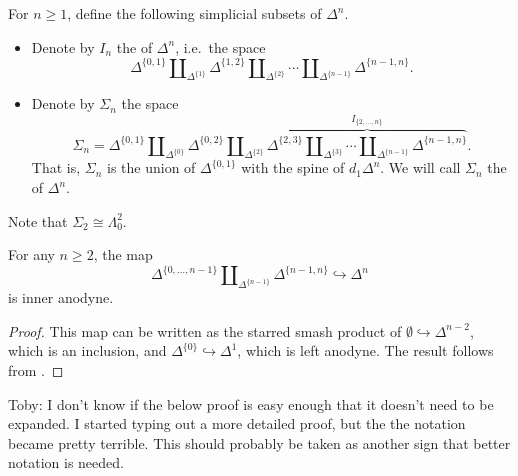 \documentclass[main.tex]{subfiles}
\begin{document}
\begin{definition}
  For $n \geq 1$, define the following simplicial subsets of $\Delta^{n}$.

  \begin{itemize}
    \item Denote by $I_{n}$ the  of $\Delta^{n}$, i.e.\ the space
      \begin{equation*}
        \Delta^{\{0, 1\}} \amalg_{\Delta^{\{1\}}} \Delta^{\{1, 2\}} \amalg_{\Delta^{\{2\}}} \cdots \amalg_{\Delta^{\{n-1\}}} \Delta^{\{n-1, n\}}.
      \end{equation*}

    \item Denote by $\Sigma_{n}$ the space
      \begin{equation*}
        \Sigma_{n} = \Delta^{\{0, 1\}} \amalg_{\Delta^{\{0\}}} \Delta^{\{0, 2\}} \amalg_{\Delta^{\{2\}}} \overbrace{\Delta^{\{2, 3\}} \amalg_{\Delta^{\{3\}}}\cdots \amalg_{\Delta^{\{n-1\}}} \Delta^{\{n-1, n\}}}^{I_{\{2, \ldots, n\}}} .
      \end{equation*}
      That is, $\Sigma_{n}$ is the union of $\Delta^{\{0, 1\}}$ with the spine of $d_{1}\Delta^{n}$. We will call $\Sigma_{n}$ the  of $\Delta^{n}$.
  \end{itemize}
\end{definition}

Note that $\Sigma_{2} \cong \Lambda^{2}_{0}$.

\begin{lemma}
  For any $n \geq 2$, the map
  \begin{equation*}
    \Delta^{\{0, \ldots, n-1\}} \amalg_{\Delta^{\{n-1\}}} \Delta^{\{n-1, n\}} \hookrightarrow \Delta^{n}
  \end{equation*}
  is inner anodyne.
\end{lemma}
\begin{proof}
  This map can be written as the starred smash product of $\emptyset \hookrightarrow \Delta^{n-2}$, which is an inclusion, and $\Delta^{\{0\}} \hookrightarrow \Delta^{1}$, which is left anodyne. The result follows from \cite[Lemma 2.1.2.3]{highertopostheory}.
\end{proof}

\begin{note}
  Toby: I don't know if the below proof is easy enough that it doesn't need to be expanded. I started typing out a more detailed proof, but the the notation became pretty terrible. This should probably be taken as another sign that better notation is needed.
\end{note}
\end{document}
